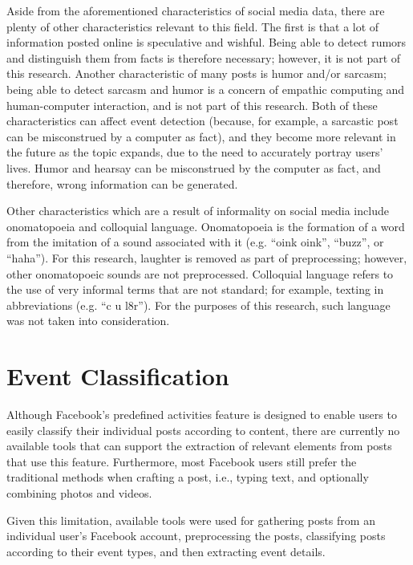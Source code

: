 Aside from the aforementioned characteristics of social media data, there are plenty of other characteristics relevant to this field. The first is that a lot of information posted online is speculative and wishful. Being able to detect rumors and distinguish them from facts is therefore necessary; however, it is not part of this research. Another characteristic of many posts is humor and/or sarcasm; being able to detect sarcasm and humor is a concern of empathic computing and human-computer interaction, and is not part of this research. Both of these characteristics can affect event detection (because, for example, a sarcastic post can be misconstrued by a computer as fact), and they become more relevant in the future as the topic expands, due to the need to accurately portray users' lives. Humor and hearsay can be misconstrued by the computer as fact, and therefore, wrong information can be generated.

Other characteristics which are a result of informality on social media include onomatopoeia and colloquial language. Onomatopoeia is the formation of a word from the imitation of a sound associated with it (e.g. ``oink oink'', ``buzz'', or ``haha''). For this research, laughter is removed as part of preprocessing; however, other onomatopoeic sounds are not preprocessed. Colloquial language refers to the use of very informal terms that are not standard; for example, texting in abbreviations (e.g. ``c u l8r''). For the purposes of this research, such language was not taken into consideration.


\section{Event Classification}
Although Facebook's predefined activities feature is designed to enable users to easily classify their individual posts according to content, there are currently no available tools that can support the extraction of relevant elements from posts that use this feature. Furthermore, most Facebook users still prefer the traditional methods when crafting a post, i.e., typing text, and optionally combining photos and videos.

Given this limitation, available tools were used for gathering posts from an individual user's Facebook account, preprocessing the posts, classifying posts according to their event types, and then extracting event details.

